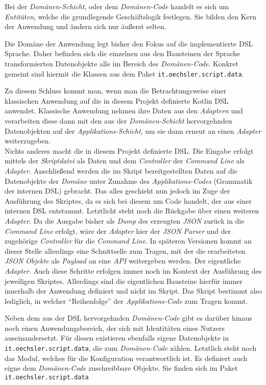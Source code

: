 Bei der \emph{Domänen-Schicht}, oder dem \emph{Domänen-Code} handelt es sich um \emph{Entitäten}, welche die grundlegende Geschäftslogik festlegen.
Sie bilden den Kern der Anwendung und ändern sich nur äußerst selten.

Die Domäne der Anwendung legt bisher den Fokus auf die implementierte DSL Sprache.
Daher befinden sich die einzelnen aus den Bausteinen der Sprache transformierten Datenobjekte alle im Bereich des \emph{Domänen-Code}.
Konkret gemeint sind hiermit die Klassen aus dem Paket \texttt{it.oechsler.script.data}.

Zu diesem Schluss kommt man, wenn man die Betrachtungsweise einer klassischen Anwendung auf die in diesem Projekt definierte Kotlin DSL anwendet.
Klassische Anwendung nehmen ihre Daten aus den \emph{Adaptern} und verarbeiten diese dann mit den aus der \emph{Domänen-Schicht} hervorgehnden Datenobjekten auf der \emph{Applikations-Schicht}, um sie dann erneut an einen \emph{Adapter} weiterzugeben.\\
Nichts anderes macht die in diesem Projekt definierte DSL.
Die Eingabe erfolgt mittels der \emph{Skriptdatei} als Daten und dem \emph{Controller} der \emph{Command Line} als \emph{Adapter}.
Anschließend werden die im Skript bereitgestellten Daten auf die Datenobjekte der \emph{Domäne} unter Zunahme des \emph{Applikations-Codes} (Grammatik der internen DSL) gebracht.
Das alles geschieht nun jedoch im Zuge der Ausführung des Skriptes, da es sich bei diesem um Code handelt, der aus einer internen DSL entstammt.
Letztlicht steht noch die Rückgabe über einen weiteren \emph{Adapter}.
Da die Ausgabe bisher als \emph{Dump} des erzeugten \emph{JSON} zurück in die \emph{Command Line} erfolgt, wäre der \emph{Adapter} hier der \emph{JSON} \emph{Parser} und der zugehörige \emph{Controller} für die \emph{Command Line}.
In späteren Versionen kommt an dieser Stelle allerdings eine Schnittselle zum Tragen, mit der die erarbeiteten \emph{JSON} \emph{Objekte} als \emph{Payload} an eine \emph{API} weitergeben werden.
Der eigentliche \emph{Adapter}.
Auch diese Schritte erfolgen immer noch im Kontext der Ausführung des jeweiligen Skriptes.
Allerdings sind die eigentlichen Bausteine hierfür immer innerhalb der Anwendung definiert und nicht im Skript. 
Das Skript bestimmt also lediglich, in welcher \enquote{Reihenfolge} der \emph{Applikations-Code} zum Tragen kommt.

Neben dem aus der DSL hervorgehnden \emph{Domänen-Code} gibt es darüber hinaus noch einen Anwendungsbereich, der sich mit Identitäten eines Nutzers auseinandersetzt.
Für diesen existieren ebenfalls eigene Datenobjekte in \texttt{it.oechsler.script.data}, die zum \emph{Domänen-Code} zählen.
Letztlich steht noch das Modul, welches für die Konfiguration verantwortlich ist.
Es definiert auch eigne dem \emph{Domänen-Code} zuschreibbare Objekte.
Sie finden sich im Paket \texttt{it.oechsler.script.data}

